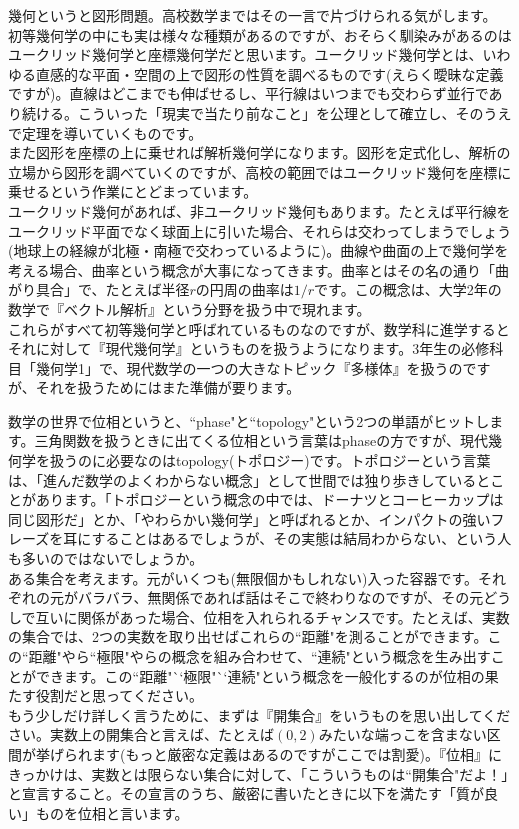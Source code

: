 幾何というと図形問題。高校数学まではその一言で片づけられる気がします。\\
初等幾何学の中にも実は様々な種類があるのですが、おそらく馴染みがあるのはユークリッド幾何学と座標幾何学だと思います。ユークリッド幾何学とは、いわゆる直感的な平面・空間の上で図形の性質を調べるものです(えらく曖昧な定義ですが)。直線はどこまでも伸ばせるし、平行線はいつまでも交わらず並行であり続ける。こういった「現実で当たり前なこと」を公理として確立し、そのうえで定理を導いていくものです。\\
また図形を座標の上に乗せれば解析幾何学になります。図形を定式化し、解析の立場から図形を調べていくのですが、高校の範囲ではユークリッド幾何を座標に乗せるという作業にとどまっています。\\
ユークリッド幾何があれば、非ユークリッド幾何もあります。たとえば平行線をユークリッド平面でなく球面上に引いた場合、それらは交わってしまうでしょう(地球上の経線が北極・南極で交わっているように)。曲線や曲面の上で幾何学を考える場合、曲率という概念が大事になってきます。曲率とはその名の通り「曲がり具合」で、たとえば半径$r$の円周の曲率は$1/r$です。この概念は、大学2年の数学で『ベクトル解析』という分野を扱う中で現れます。\\
これらがすべて初等幾何学と呼ばれているものなのですが、数学科に進学するとそれに対して『現代幾何学』というものを扱うようになります。3年生の必修科目「幾何学1」で、現代数学の一つの大きなトピック『多様体』を扱うのですが、それを扱うためにはまた準備が要ります。


数学の世界で位相というと、``phase"と``topology"という2つの単語がヒットします。三角関数を扱うときに出てくる位相という言葉はphaseの方ですが、現代幾何学を扱うのに必要なのはtopology(トポロジー)です。トポロジーという言葉は、「進んだ数学のよくわからない概念」として世間では独り歩きしているとことがあります。「トポロジーという概念の中では、ドーナツとコーヒーカップは同じ図形だ」とか、「やわらかい幾何学」と呼ばれるとか、インパクトの強いフレーズを耳にすることはあるでしょうが、その実態は結局わからない、という人も多いのではないでしょうか。\\
ある集合を考えます。元がいくつも(無限個かもしれない)入った容器です。それぞれの元がバラバラ、無関係であれば話はそこで終わりなのですが、その元どうしで互いに関係があった場合、位相を入れられるチャンスです。たとえば、実数の集合では、2つの実数を取り出せばこれらの``距離"を測ることができます。この``距離"やら``極限"やらの概念を組み合わせて、``連続"という概念を生み出すことができます。この``距離"``極限"``連続"という概念を一般化するのが位相の果たす役割だと思ってください。\\
もう少しだけ詳しく言うために、まずは『開集合』をいうものを思い出してください。実数上の開集合と言えば、たとえば$(0,2)$みたいな端っこを含まない区間が挙げられます(もっと厳密な定義はあるのですがここでは割愛)。『位相』にきっかけは、実数とは限らない集合に対して、「こういうものは``開集合"だよ！」と宣言すること。その宣言のうち、厳密に書いたときに以下を満たす「質が良い」ものを位相と言います。

